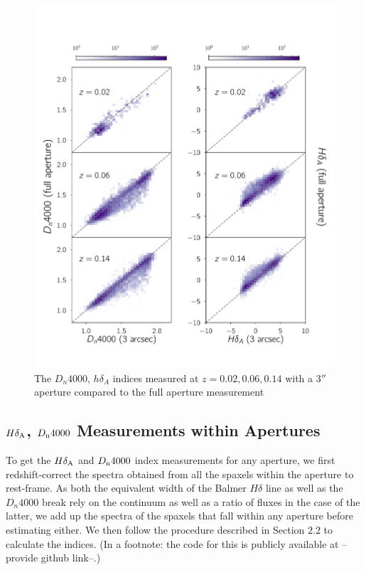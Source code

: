\begin{figure}
\includegraphics[width=\textwidth]{figures/full_aperture_comparisons.pdf}
\caption[The $D_{n}4000$, $h\delta_{A}$ indices measured at $z = 0.02,0.06,0.14$ with a $3''$ aperture compared to the full aperture measurement]
{ The $D_{n}4000$, $h\delta_{A}$ indices measured at $z = 0.02,0.06,0.14$ with a $3''$ aperture compared to the full aperture measurement
\label{fig:redshift_comparison}}
\end{figure}


\subsection{$H\delta_{\rm A}$, $D_{\rm n}4000$ Measurements within Apertures}
To get the $H\delta_{\rm A}$ and $D_{\rm n}4000$ index measurements for any aperture, we first redshift-correct the spectra obtained from all the spaxels within the aperture to rest-frame. As both the equivalent width of the Balmer $H\delta$ line as well as the $D_{n}4000$ break rely on the continuum as well as a ratio of fluxes in the case of the latter, we add up the spectra of the spaxels that fall within any aperture before estimating either. We then follow the procedure described in Section $2.2$ to calculate the indices. (In a footnote: the code for this is publicly available at --provide github link--.)

